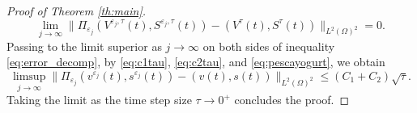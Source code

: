 \documentclass[10pt,a4paper]{amsart}
\begin{document}
\begin{proof}[Proof of Theorem \ref{th:main}]
\begin{equation}
	\label{eq:pescayogurt}
	\lim_{j \to \infty}\|\Pi_{\varepsilon_j}(V^{\varepsilon_j,\tau}(t),S^{\varepsilon_j,\tau}(t)) - (V^{\tau}(t),S^{\tau}(t))\|_{L^2(\Omega)^2} = 0.
\end{equation}
Passing to the limit superior as $j \to \infty$ on both sides of inequality \eqref{eq:error_decomp}, by \eqref{eq:c1tau}, \eqref{eq:c2tau}, and \eqref{eq:pescayogurt}, we obtain
\begin{equation*}
	\limsup_{j \to \infty}  \| \Pi_{\varepsilon_j} (v^{\varepsilon_j}(t),s^{\varepsilon_j}(t)) - (v(t),s(t))\|_{L^2(\Omega)^2}  \leq (C_1 + C_2) \sqrt{\tau}.
\end{equation*}
Taking the limit as the time step size $\tau \to 0^+$ concludes the proof.
\end{proof}
\end{document}
